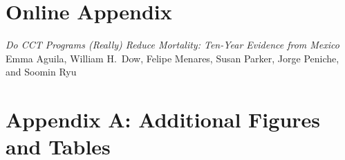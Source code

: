\documentclass[12pt]{article}
\begin{document}
\setcounter{secnumdepth}{0}
\bigskip
\singlespace
\renewcommand{\bibname}{References}
{\linespread{1.0}\selectfont}


\newpage



\newpage


\appendix

\newpage
\setcounter{page}{1}
\section*{Online Appendix}\label{appOnline}
\vspace{2cm}
\begin{center}
{\Large \it Do CCT Programs (Really) Reduce Mortality: Ten-Year Evidence from Mexico} \\[.4cm]
Emma Aguila, William H.\ Dow, Felipe Menares, Susan Parker, Jorge Peniche, and Soomin Ryu
\end{center}
\listoffigures
\listoftables

\newpage
\section*{Appendix A: Additional Figures and Tables}\label{appA}
\setcounter{table}{0}
\renewcommand{\thetable}{A.\arabic{table}}
\setcounter{figure}{0}
\renewcommand{\thefigure}{A.\arabic{figure}}
\renewcommand{\thesubsection}{\Alph{subsection}}



  
\end{document}

